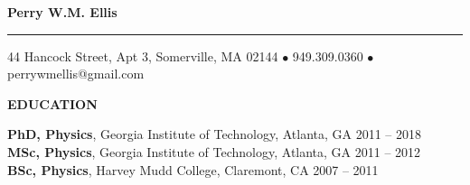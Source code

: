 \documentclass[10pt]{article}
\newcommand{\HRule}{\rule{\linewidth}{0.5mm}}
\newenvironment{changemargin}[2]{%
  \list{}{\rightmargin#2\leftmargin#1
    \parsep=0pt\topsep=1pt\partopsep=0pt}
\item[]} {\endlist}
\newenvironment{indentmore}{\begin{changemargin}{10pt}{0cm}}{\end{changemargin}}
\begin{document}
\begin{center}

\textbf{\Large Perry W.M. Ellis}
\HRule

44 Hancock Street, Apt 3, Somerville, MA 02144 $\bullet$ 949.309.0360 $\bullet$ perrywmellis@gmail.com

\end{center}

\textbf{\large EDUCATION}
\begin{indentmore}
\textbf{PhD, Physics}, Georgia Institute of Technology, Atlanta, GA \hfill 2011 -- 2018\\

\textbf{MSc, Physics}, Georgia Institute of Technology, Atlanta, GA \hfill 2011 -- 2012\\

\textbf{BSc, Physics}, Harvey Mudd College, Claremont, CA \hfill 2007 -- 2011\\
\end{indentmore}
\end{document}
